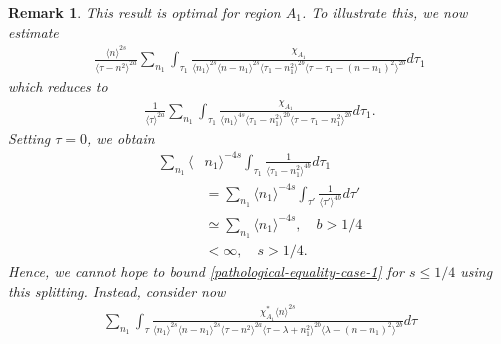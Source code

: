 \documentclass[12pt,reqno]{amsart}
\numberwithin{equation}{section}  %
\newtheorem{remark}[theorem]{Remark}
\begin{document}
\begin{framed}
\begin{remark}
This result is optimal for region $A_{1}$. To illustrate this, we now estimate
%
%
\begin{equation*}
  \begin{split}
     \frac{ \langle n
    \rangle ^{2s}}{\langle \tau - n^{2} \rangle ^{2a}}
    \sum_{n_{1}} \int_{\tau_{1}} \frac{\chi_{A_{1}}}{ \langle n_{1} \rangle ^{2s} \langle n-n_{1} \rangle ^{2s} 
    \langle \tau_{1} - n_{1}^{2} \rangle^{2b} \langle  \tau - \tau_{1} -
    (n - n_{1})^{2} \rangle^{2b} }
    d \tau_1 
  \end{split}
\end{equation*}
which reduces to 
\begin{equation}
  \label{pathological-equality-case-1}
  \begin{split}
    \frac{ 1}{\langle \tau \rangle ^{2a}}
    \sum_{n_{1}} \int_{\tau_{1}} \frac{\chi_{A_{1}}}{ \langle n_{1} \rangle ^{4s}
    \langle \tau_{1} - n_{1}^{2} \rangle^{2b} \langle  \tau - \tau_{1} -
    n_{1}^{2} \rangle^{2b} }
    d \tau_1.
  \end{split}
\end{equation}
%
%
%
%
Setting $\tau = 0$, we obtain
%
%
%
\begin{equation*}
\begin{split}
  \sum_{n_{1}} \langle & n_{1}\rangle ^{-4s} \int_{\tau_{1}} \frac{1}{\langle
   \tau_{1} - n_{1}^{2} \rangle ^{4b}}d \tau_{1}
   \\
   & = \sum_{n_{1}} \langle
  n_{1}\rangle ^{-4s} \int_{\tau'} \frac{1}{\langle
   \tau' \rangle ^{4b}}d \tau'
   \\
   & \simeq \sum_{n_{1}} \langle n_{1} \rangle ^{-4s}, \quad b > 1/4
   \\
   & < \infty, \quad s > 1/4.
\end{split}
\end{equation*}
%
Hence, we cannot hope to bound \eqref{pathological-equality-case-1} for $s \le
1/4$ using this splitting. Instead, consider now
%
%
\begin{equation*}
\begin{split}
  \sum_{n_{1}} \int_{\tau} \frac{\chi^{*}_{A_{1}} \langle n \rangle ^{2s}}{\langle n_{1} \rangle
  ^{2s} \langle n - n_{1} \rangle ^{2s} \langle \tau - n^{2} \rangle ^{2a} \langle
  \tau - \lambda +  n_{1}^{2} \rangle^{2b}
   \langle \lambda - (n - n_{1})^{2} \rangle^{2b} } d \tau
\end{split}
\end{equation*}

\end{remark}
\end{framed}
\end{document}
